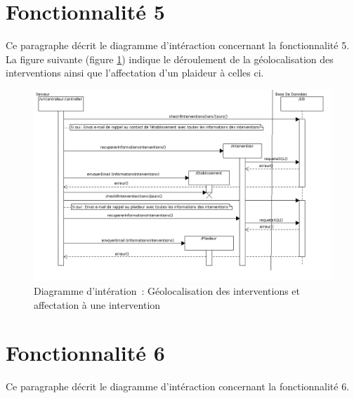 \section{Fonctionnalité 5}
Ce paragraphe décrit le diagramme d'intéraction concernant la fonctionnalité 5. \\

La figure suivante (figure \ref{diagrammeInteraction7}) indique le déroulement de la géolocalisation des interventions ainsi que l'affectation d'un plaideur à celles ci. \\
\begin{figure}[H]
	\centering
	\includegraphics[scale=0.5]{images/diagrammesInteraction/07_diagrammeInteractionF5.png}
	\caption{Diagramme d'intération~: Géolocalisation des interventions et affectation à une intervention}
	\label{diagrammeInteraction7}
\end{figure}

\section{Fonctionnalité 6}
Ce paragraphe décrit le diagramme d'intéraction concernant la fonctionnalité 6. \\

